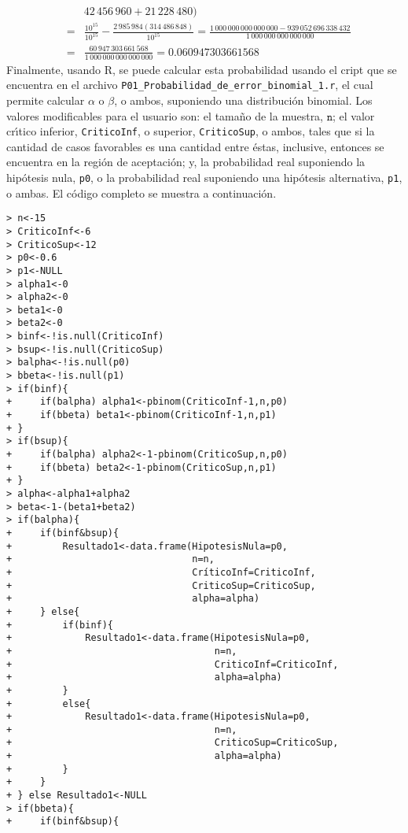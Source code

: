\begin{solucion}
\begin{enumerate}
\begin{eqnarray*}
   & & 42\,456\,960 + 21\,228\,480 ) \\
   & = & \frac{10^{15}}{10^{15}} - \frac{2\,985\,984(314\,486\,848)}{10^{15}} = \frac{1\,000\,000\,000\,000\,000 - 939\,052\,696\,338\,432}{1\,000\,000\,000\,000\,000} \\
   & = & \frac{60\,947\,303\,661\,568}{1\,000\,000\,000\,000\,000} = 0.060947303661568
  \end{eqnarray*}
  Finalmente, usando R, se puede calcular esta probabilidad usando el cript que se encuentra en el archivo \texttt{P01\_Probabilidad\_de\_error\_binomial\_1.r}, el cual permite calcular $\alpha$ o $\beta$, o ambos, suponiendo una distribuci\'on binomial. Los valores modificables para el usuario son: el tama\~no de la muestra, $\texttt{n}$; el valor cr\'{\i}tico inferior, \texttt{CriticoInf}, o superior, \texttt{CriticoSup}, o ambos, tales que si la cantidad de casos favorables es una cantidad entre \'estas, inclusive, entonces se encuentra en la regi\'on de aceptaci\'on; y, la probabilidad real suponiendo la hip\'otesis nula, \texttt{p0}, o la probabilidad real suponiendo una hip\'otesis alternativa, \texttt{p1}, o ambas. El c\'odigo completo se muestra a continuaci\'on.
  \begin{verbatim}
> n<-15
> CriticoInf<-6
> CriticoSup<-12
> p0<-0.6
> p1<-NULL
> alpha1<-0
> alpha2<-0
> beta1<-0
> beta2<-0
> binf<-!is.null(CriticoInf)
> bsup<-!is.null(CriticoSup)
> balpha<-!is.null(p0)
> bbeta<-!is.null(p1)
> if(binf){
+     if(balpha) alpha1<-pbinom(CriticoInf-1,n,p0)
+     if(bbeta) beta1<-pbinom(CriticoInf-1,n,p1)
+ }
> if(bsup){
+     if(balpha) alpha2<-1-pbinom(CriticoSup,n,p0)
+     if(bbeta) beta2<-1-pbinom(CriticoSup,n,p1)
+ }
> alpha<-alpha1+alpha2
> beta<-1-(beta1+beta2)
> if(balpha){
+     if(binf&bsup){
+         Resultado1<-data.frame(HipotesisNula=p0,
+                                n=n,
+                                CríticoInf=CriticoInf,
+                                CriticoSup=CriticoSup,
+                                alpha=alpha)
+     } else{
+         if(binf){
+             Resultado1<-data.frame(HipotesisNula=p0,
+                                    n=n,
+                                    CriticoInf=CriticoInf,
+                                    alpha=alpha)
+         }
+         else{
+             Resultado1<-data.frame(HipotesisNula=p0,
+                                    n=n,
+                                    CriticoSup=CriticoSup,
+                                    alpha=alpha)
+         }
+     }
+ } else Resultado1<-NULL
> if(bbeta){
+     if(binf&bsup){

\end{verbatim}
\end{enumerate}
\end{solucion}
